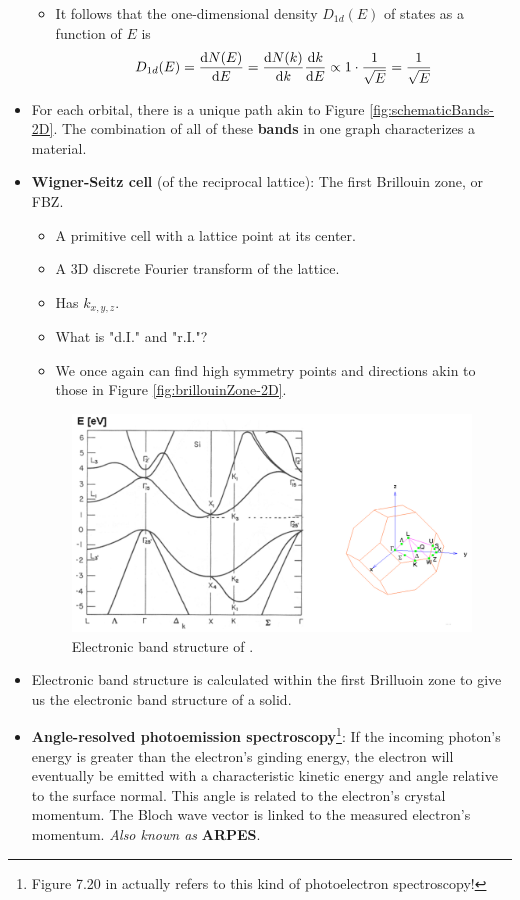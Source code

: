 \documentclass[../notes.tex]{subfiles}
\begin{document}
\begin{itemize}
\begin{itemize}
        \item It follows that the one-dimensional density $D_{1d}(E)$ of states as a function of $E$ is
        \begin{equation*}
            D_{1d}(E) = \dv{N(E)}{E}
            = \dv{N(k)}{k}\dv{k}{E}
            \propto 1\cdot\frac{1}{\sqrt{E}}
            = \frac{1}{\sqrt{E}}
        \end{equation*}
    \end{itemize}
    \item For each orbital, there is a unique path akin to Figure \ref{fig:schematicBands-2D}. The combination of all of these \textbf{bands} in one graph characterizes a material.
    \item \textbf{Wigner-Seitz cell} (of the reciprocal lattice): The first Brillouin zone, or FBZ.
    \begin{itemize}
        \item A primitive cell with a lattice point at its center.
        \item A 3D discrete Fourier transform of the lattice.
        \item Has $k_{x,y,z}$.
        \item What is "d.I." and "r.I."?
        \item We once again can find high symmetry points and directions akin to those in Figure \ref{fig:brillouinZone-2D}.
    \end{itemize}
    \begin{figure}[h!]
        \centering
        \includegraphics[width=0.75\linewidth]{../ExtFiles/bandStructure-Si.png}
        \caption{Electronic band structure of .}
        \label{fig:bandStructure-Si}
    \end{figure}
    \item Electronic band structure is calculated within the first Brilluoin zone to give us the electronic band structure of a solid.
    \item \textbf{Angle-resolved photoemission spectroscopy}\footnote{Figure 7.20 in \textcite{bib:APChemNotes} actually refers to this kind of photoelectron spectroscopy!}: If the incoming photon's energy is greater than the electron's ginding energy, the electron will eventually be emitted with a characteristic kinetic energy and angle relative to the surface normal. This angle is related to the electron's crystal momentum. The Bloch wave vector is linked to the measured electron's momentum. \emph{Also known as} \textbf{ARPES}.

\end{itemize}
\end{document}
